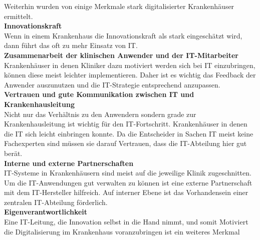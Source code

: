 Weiterhin wurden von \cite{huebner2019} einige Merkmale stark digitalisierter Krankenhäuser ermittelt.
\vspace{\parheadvspace}\\
\textbf{Innovationskraft}\\
Wenn in einem Krankenhaus die Innovationskraft als stark eingeschätzt wird, dann führt das oft zu mehr Einsatz von IT. 
\vspace{\parheadvspace}\\
\textbf{Zusammenarbeit der klinischen Anwender und der IT-Mitarbeiter}\\
Krankenhäuser in denen Kliniker dazu motiviert werden sich bei IT einzubringen, können diese meist leichter implementieren. Daher ist es wichtig das Feedback der Anwender auszunutzen und die IT-Strategie entsprechend anzupassen.
\vspace{\parheadvspace}\\
\textbf{Vertrauen und gute Kommunikation zwischen IT und Krankenhausleitung}\\
Nicht nur das Verhältnis zu den Anwendern sondern grade zur Krankenhausleitung ist wichtig für den IT-Fortschritt. Krankenhäuser in denen die IT sich leicht einbringen konnte. Da die Entscheider in Sachen IT meist keine Fachexperten sind müssen sie darauf Vertrauen, dass die IT-Abteilung hier gut berät.
\vspace{\parheadvspace}\\
\textbf{Interne und externe Partnerschaften}\\
IT-Systeme in Krankenhäusern sind meist auf die jeweilige Klinik zugeschnitten. Um die IT-Anwendungen gut verwalten zu können ist eine externe Partnerschaft mit dem IT-Hersteller hilfreich. Auf interner Ebene ist das Vorhandensein einer zentralen IT-Abteilung förderlich.
\vspace{\parheadvspace}\\
\textbf{Eigenverantwortlichkeit}\\
Eine IT-Leitung, die Innovation selbst in die Hand nimmt, und somit Motiviert die Digitalisierung im Krankenhaus voranzubringen ist ein weiteres Merkmal
